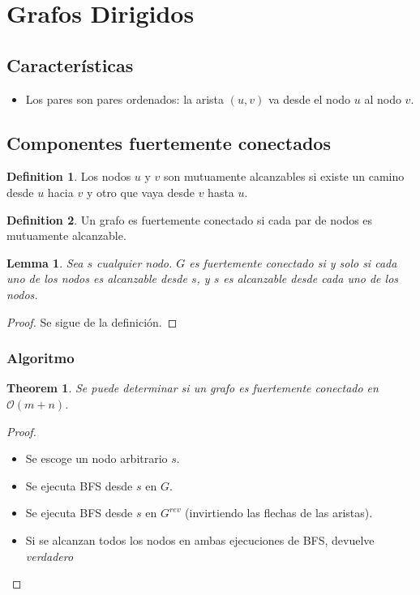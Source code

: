\documentclass[12pt, fleqn]{article}
\newtheorem{theorem}{Theorem}[section]
\newtheorem{lemma}{Lemma}[section]
\theoremstyle{definition}
\newtheorem{definition}{Definition}[section]
\begin{document}
    \section{Grafos Dirigidos}
        \subsection{Características}
            \begin{itemize}
                \item Los pares son pares ordenados: la arista $(u,v)$ va desde el nodo $u$ al nodo $v$.
            \end{itemize}
        \subsection{Componentes fuertemente conectados}
            \begin{definition}
                Los nodos $u$ y $v$ son mutuamente alcanzables si existe un camino desde $u$ hacia $v$ y otro que vaya
                desde $v$ hasta $u$.
            \end{definition}
            \begin{definition}
                Un grafo es fuertemente conectado si cada par de nodos es mutuamente alcanzable.
            \end{definition}
            \begin{lemma}
                Sea $s$ cualquier nodo. $G$ es fuertemente conectado si y solo si cada uno de los nodos
                es alcanzable desde $s$, y $s$ es alcanzable desde cada uno de los nodos.
            \end{lemma}
            \begin{proof}
                Se sigue de la definición.
            \end{proof}
            \subsubsection{Algoritmo}
                \begin{theorem}
                    Se puede determinar si un grafo es fuertemente conectado en $\mathcal{O}(m+n)$.
                \end{theorem}
                \begin{proof}
                    \begin{itemize}
                        \item Se escoge un nodo arbitrario $s$.
                        \item Se ejecuta BFS desde $s$ en $G$.
                        \item Se ejecuta BFS desde $s$ en $G^{rev}$ (invirtiendo las flechas de las aristas).
                        \item Si se alcanzan todos los nodos en ambas ejecuciones de BFS, devuelve \emph{verdadero}
                    \end{itemize}
                \end{proof}
\end{document}
